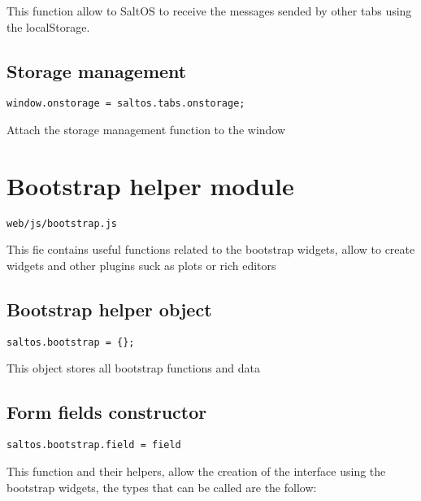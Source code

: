 \documentclass[a4paper]{book}
\begin{document}
This function allow to SaltOS to receive the messages sended by other tabs
using the localStorage.

\hypertarget{toc426}{}
\subsection{Storage management}

\begin{lstlisting}
window.onstorage = saltos.tabs.onstorage;
\end{lstlisting}

Attach the storage management function to the window

\hypertarget{toc427}{}
\section{Bootstrap helper module}

\begin{lstlisting}
web/js/bootstrap.js
\end{lstlisting}

This fie contains useful functions related to the bootstrap widgets, allow to create widgets and
other plugins suck as plots or rich editors

\hypertarget{toc428}{}
\subsection{Bootstrap helper object}

\begin{lstlisting}
saltos.bootstrap = {};
\end{lstlisting}

This object stores all bootstrap functions and data

\hypertarget{toc429}{}
\subsection{Form fields constructor}

\begin{lstlisting}
saltos.bootstrap.field = field
\end{lstlisting}

This function and their helpers, allow the creation of the interface using the bootstrap
widgets, the types that can be called are the follow:
\end{document}
